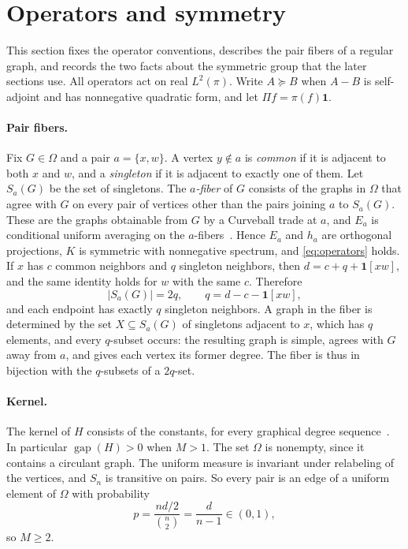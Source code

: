\section{Operators and symmetry}\label{sec:setup}
This section fixes the operator conventions, describes the pair fibers of a
regular graph, and records the two facts about the symmetric group that the
later sections use. All operators act on real $L^2(\pi)$. Write $A\succeq B$
when $A-B$ is self-adjoint and has nonnegative quadratic form, and let
$\Pi f=\pi(f)\mathbf1$.

\paragraph{Pair fibers.}
Fix $G\in\Omega$ and a pair $a=\{x,w\}$. A vertex $y\notin a$ is \emph{common}
if it is adjacent to both $x$ and $w$, and a \emph{singleton} if it is adjacent
to exactly one of them. Let $S_a(G)$ be the set of singletons. The
\emph{$a$-fiber} of $G$ consists of the graphs in $\Omega$ that agree with $G$
on every pair of vertices other than the pairs joining $a$ to $S_a(G)$. These
are the graphs obtainable from $G$ by a Curveball trade at $a$, and $E_a$ is
conditional uniform averaging on the $a$-fibers~\cite[Section~2]{S26}. Hence
$E_a$ and $h_a$ are orthogonal projections, $K$ is symmetric with nonnegative
spectrum, and \eqref{eq:operators} holds. If $x$ has $c$ common neighbors and
$q$ singleton neighbors, then $d=c+q+\mathbf1[xw]$, and the same identity
holds for $w$ with the same $c$. Therefore
\begin{equation}\label{eq:balance}
 |S_a(G)|=2q,\qquad q=d-c-\mathbf1[xw],
\end{equation}
and each endpoint has exactly $q$ singleton neighbors. A graph in the fiber is
determined by the set $X\subseteq S_a(G)$ of singletons adjacent to $x$, which
has $q$ elements, and every $q$-subset occurs: the resulting graph is simple,
agrees with $G$ away from $a$, and gives each vertex its former degree. The
fiber is thus in bijection with the $q$-subsets of a $2q$-set.

\paragraph{Kernel.}
The kernel of $H$ consists of the constants, for every graphical degree
sequence~\cite[Lemma~6.3]{S26}. In particular $\operatorname{gap}(H)>0$ when
$M>1$. The set $\Omega$ is nonempty, since it contains a circulant graph. The
uniform measure is invariant under relabeling of the vertices, and $S_n$ is
transitive on pairs. So every pair
is an edge of a uniform element of $\Omega$ with probability
\begin{equation}\label{eq:density}
 p=\frac{nd/2}{\binom n2}=\frac d{n-1}\in(0,1),
\end{equation}
so $M\ge2$.

